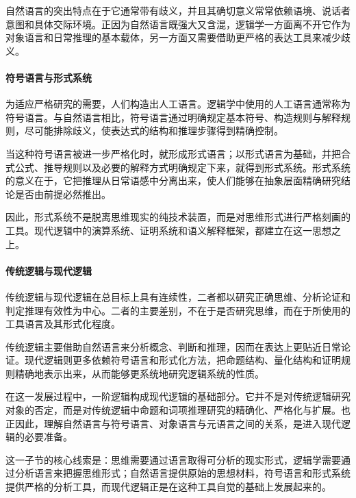 自然语言的突出特点在于它通常带有歧义，并且其确切意义常常依赖语境、说话者意图和具体交际环境。正因为自然语言既强大又含混，逻辑学一方面离不开它作为对象语言和日常推理的基本载体，另一方面又需要借助更严格的表达工具来减少歧义。

\paragraph{符号语言与形式系统}\label{logic.symbolic_language}\label{logic.formal_system}

为适应严格研究的需要，人们构造出人工语言。逻辑学中使用的人工语言通常称为符号语言。与自然语言相比，符号语言通过明确规定基本符号、构造规则与解释规则，尽可能排除歧义，使表达式的结构和推理步骤得到精确控制。

当这种符号语言被进一步严格化时，就形成形式语言；以形式语言为基础，并把合式公式、推导规则以及必要的解释方式明确规定下来，就得到形式系统。形式系统的意义在于，它把推理从日常语感中分离出来，使人们能够在抽象层面精确研究结论是否由前提必然推出。

因此，形式系统不是脱离思维现实的纯技术装置，而是对思维形式进行严格刻画的工具。现代逻辑中的演算系统、证明系统和语义解释框架，都建立在这一思想之上。

\paragraph{传统逻辑与现代逻辑}\label{logic.traditional_and_modern_logic}

传统逻辑与现代逻辑在总目标上具有连续性，二者都以研究正确思维、分析论证和判定推理有效性为中心。二者的主要差别，不在于是否研究思维，而在于所使用的工具语言及其形式化程度。

传统逻辑主要借助自然语言来分析概念、判断和推理，因而在表达上更贴近日常论证。现代逻辑则更多依赖符号语言和形式化方法，把命题结构、量化结构和证明规则精确地表示出来，从而能够更系统地研究逻辑系统的性质。

在这一发展过程中，一阶逻辑构成现代逻辑的基础部分。它并不是对传统逻辑研究对象的否定，而是对传统逻辑中命题和词项推理研究的精确化、严格化与扩展。也正因此，理解自然语言与符号语言、对象语言与元语言之间的关系，是进入现代逻辑的必要准备。

\begin{important}
这一子节的核心线索是：思维需要通过语言取得可分析的现实形式，逻辑学需要通过分析语言来把握思维形式；自然语言提供原始的思想材料，符号语言和形式系统提供严格的分析工具，而现代逻辑正是在这种工具自觉的基础上发展起来的。
\end{important}

